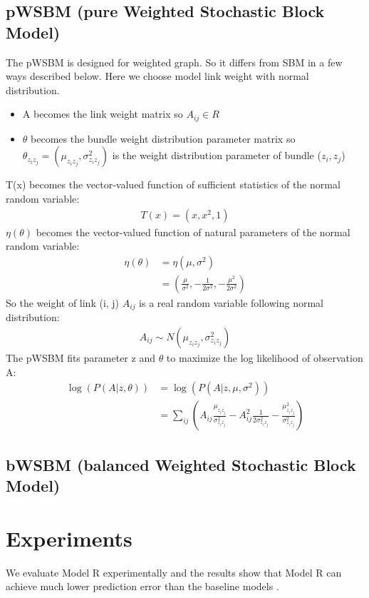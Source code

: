 \documentclass[letterpaper]{article}
\begin{document}
\subsection{pWSBM (pure Weighted Stochastic Block Model)}
The pWSBM is designed for weighted graph.
So it differs from SBM in a few ways described below.
Here we choose model link weight with normal distribution.
\begin{itemize}
	\item A becomes the link weight matrix so $ A_{ij} \in R $
	\item $ \theta $ becomes the bundle weight distribution parameter matrix
	so $ \theta_{z_i z_j} = (\mu_{z_i z_j}, \sigma_{z_i z_j}^2) $
	is the weight distribution parameter of bundle ($z_i, z_j$)
\end{itemize}
T(x) becomes the vector-valued function of sufficient statistics of the normal random variable:
\begin{align*}
	T(x) = (x, x^2, 1)
\end{align*}
$ \eta(\theta) $ becomes the vector-valued function of natural parameters of the normal random variable:
\begin{align*}
	\eta(\theta)
	&= \eta(\mu, \sigma^2)\\
	&= (\frac{\mu}{\sigma^2}, -\frac{1}{2\sigma^2}, -\frac{\mu^2}{2\sigma^2})
\end{align*}
So the weight of link (i, j)  $ A_{ij} $ is a real random variable following normal distribution:
\begin{align*}
	A_{ij} \sim N(\mu_{z_i z_j}, \sigma_{z_i z_j}^2)
\end{align*}
The pWSBM fits parameter z and $ \theta $
to maximize the log likelihood of observation A:
\begin{align*}
\log(P(A|z, \theta))
&= \log(P(A|z, \mu, \sigma^2))\\
&= \sum_{ij} (
A_{ij} \frac{\mu_{z_i z_j}}{\sigma_{z_i z_j}^2}
- A_{ij}^2 \frac{1}{2\sigma_{z_i z_j}^2}
- \frac{\mu_{z_i z_j}^2}{\sigma_{z_i z_j}^2}
)
\end{align*}

\subsection{bWSBM (balanced Weighted Stochastic Block Model)}

\section{Experiments}
We evaluate Model R experimentally
and the results show that 
Model R can achieve much lower prediction error than the baseline models \cite{aicher2014learning}.
\end{document}
